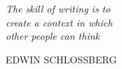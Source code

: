 \newlength\longest
\begin{center}
\clearpage

\thispagestyle{empty}
\null\vfill

\settowidth{}
\centering
\parbox{\longest}{%
	\raggedright{\huge\itshape%
		The skill of writing is to \\ 
		create a context in which  \\
		other people can think \par\bigskip
	}   
	\raggedleft\Large\MakeUppercase{Edwin Schlossberg}\par%
}

\vfill\vfill

\clearpage
\end{center}
